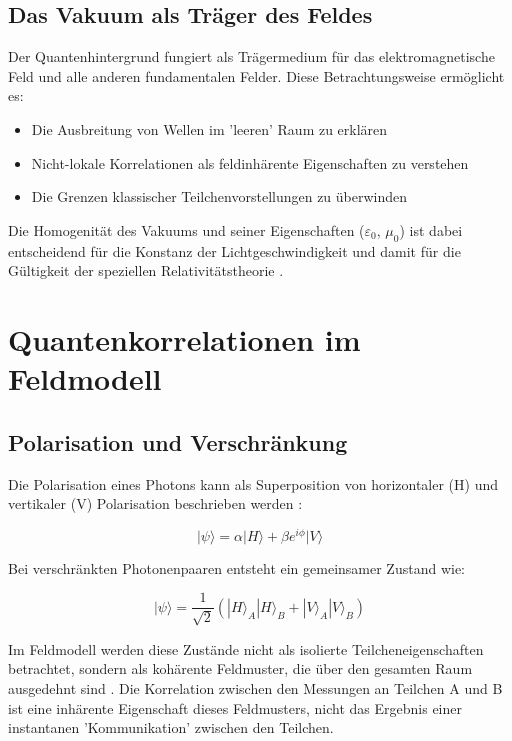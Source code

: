 \documentclass[a4paper,12pt]{article}
\begin{document}
	\subsection{Das Vakuum als Träger des Feldes}
	
	Der Quantenhintergrund fungiert als Trägermedium für das elektromagnetische Feld und alle anderen fundamentalen Felder. Diese Betrachtungsweise ermöglicht es:
	\begin{itemize}
		\item Die Ausbreitung von Wellen im 'leeren' Raum zu erklären
		\item Nicht-lokale Korrelationen als feldinhärente Eigenschaften zu verstehen
		\item Die Grenzen klassischer Teilchenvorstellungen zu überwinden
	\end{itemize}
	
	Die Homogenität des Vakuums und seiner Eigenschaften ($\varepsilon_0$, $\mu_0$) ist dabei entscheidend für die Konstanz der Lichtgeschwindigkeit und damit für die Gültigkeit der speziellen Relativitätstheorie \cite{Weinberg1995}.
	
	\section{Quantenkorrelationen im Feldmodell}
	
	\subsection{Polarisation und Verschränkung}
	
	Die Polarisation eines Photons kann als Superposition von horizontaler (H) und vertikaler (V) Polarisation beschrieben werden \cite{Fox2006}:
	
	\begin{equation}
		|\psi\rangle = \alpha |H\rangle + \beta e^{i\phi} |V\rangle
	\end{equation}
	
	Bei verschränkten Photonenpaaren entsteht ein gemeinsamer Zustand wie:
	
	\begin{equation}
		|\psi\rangle = \frac{1}{\sqrt{2}} (|H\rangle_A |H\rangle_B + |V\rangle_A |V\rangle_B)
	\end{equation}
	
	Im Feldmodell werden diese Zustände nicht als isolierte Teilcheneigenschaften betrachtet, sondern als kohärente Feldmuster, die über den gesamten Raum ausgedehnt sind \cite{Zeilinger2010}. Die Korrelation zwischen den Messungen an Teilchen A und B ist eine inhärente Eigenschaft dieses Feldmusters, nicht das Ergebnis einer instantanen 'Kommunikation' zwischen den Teilchen.
	
\end{document}
